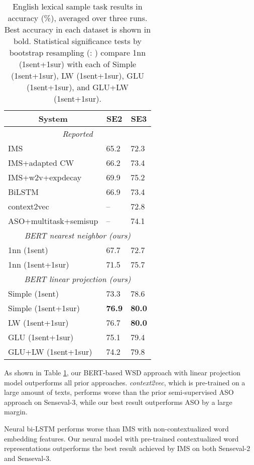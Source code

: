 \documentclass[11pt,a4paper]{article}
\begin{document}
\begin{table}[hbt]
\small
\centering
\begin{tabular}{|l|l|l|}
\hline
\multicolumn{1}{|c|}{\textbf{System}} & \multicolumn{1}{c|}{\textbf{SE2}} & \multicolumn{1}{c|}{\textbf{SE3}} \\
\hline
\multicolumn{3}{|c|}{\textit{Reported}} \\
\hline
IMS & 65.2 & 72.3 \\
IMS+adapted CW & 66.2 & 73.4 \\
IMS+w2v+expdecay & 69.9 & 75.2 \\
\hline
BiLSTM  & 66.9 & 73.4 \\
\hline
context2vec & -- & 72.8 \\
\hline
ASO+multitask+semisup & -- & 74.1 \\
\hline
\multicolumn{3}{|c|}{\textit{BERT nearest neighbor (ours)}} \\
\hline
1nn (1sent) & 67.7 & 72.7 \\
1nn (1sent+1sur) & 71.5 & 75.7 \\
\hline
\multicolumn{3}{|c|}{\textit{BERT linear projection (ours)}} \\
\hline
Simple (1sent) & 73.3 & 78.6 \\
Simple (1sent+1sur) & \textbf{76.9} & \textbf{80.0} \\
LW (1sent+1sur) & 76.7 & \textbf{80.0} \\
GLU (1sent+1sur) & 75.1 & 79.4 \\
GLU+LW (1sent+1sur) & 74.2 & 79.8 \\
\hline
\end{tabular}
\caption{\label{tab:results_ls} English lexical sample task results in accuracy (\%), averaged over three runs. Best accuracy in each dataset is shown in bold. 
Statistical significance tests by bootstrap resampling (: ) compare 1nn (1sent+1sur) with each of Simple (1sent+1sur), LW (1sent+1sur), GLU (1sent+1sur), and GLU+LW (1sent+1sur).}
\end{table} 
As shown in Table \ref{tab:results_ls}, our BERT-based WSD approach with linear projection model outperforms all prior approaches. \textit{context2vec}, which is pre-trained on a large amount of texts, performs worse than the prior semi-supervised ASO approach on Senseval-3, while our best result outperforms ASO by a large margin.

Neural bi-LSTM performs worse than IMS with non-contextualized word embedding features. Our neural model with pre-trained contextualized word representations outperforms the best result achieved by IMS on both Senseval-2 and Senseval-3.
\end{document}
